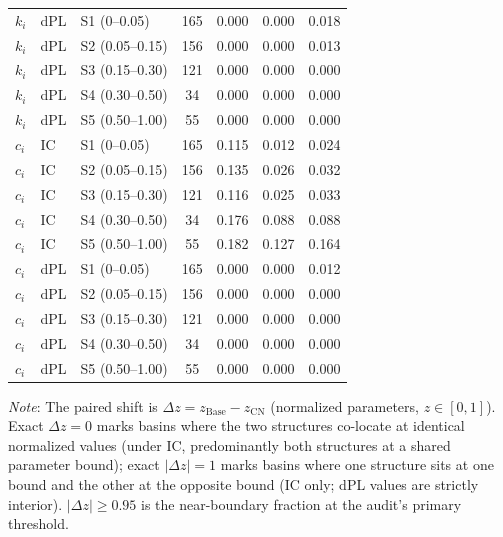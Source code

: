 \begin{table}[t]
\begin{threeparttable}
\begin{tabular}{lllcccc}
$k_i$ & dPL & S1 (0–0.05) & 165 & 0.000 & 0.000 & 0.018 \\
$k_i$ & dPL & S2 (0.05–0.15) & 156 & 0.000 & 0.000 & 0.013 \\
$k_i$ & dPL & S3 (0.15–0.30) & 121 & 0.000 & 0.000 & 0.000 \\
$k_i$ & dPL & S4 (0.30–0.50) & 34 & 0.000 & 0.000 & 0.000 \\
$k_i$ & dPL & S5 (0.50–1.00) & 55 & 0.000 & 0.000 & 0.000 \\
$c_i$ & IC & S1 (0–0.05) & 165 & 0.115 & 0.012 & 0.024 \\
$c_i$ & IC & S2 (0.05–0.15) & 156 & 0.135 & 0.026 & 0.032 \\
$c_i$ & IC & S3 (0.15–0.30) & 121 & 0.116 & 0.025 & 0.033 \\
$c_i$ & IC & S4 (0.30–0.50) & 34 & 0.176 & 0.088 & 0.088 \\
$c_i$ & IC & S5 (0.50–1.00) & 55 & 0.182 & 0.127 & 0.164 \\
$c_i$ & dPL & S1 (0–0.05) & 165 & 0.000 & 0.000 & 0.012 \\
$c_i$ & dPL & S2 (0.05–0.15) & 156 & 0.000 & 0.000 & 0.000 \\
$c_i$ & dPL & S3 (0.15–0.30) & 121 & 0.000 & 0.000 & 0.000 \\
$c_i$ & dPL & S4 (0.30–0.50) & 34 & 0.000 & 0.000 & 0.000 \\
$c_i$ & dPL & S5 (0.50–1.00) & 55 & 0.000 & 0.000 & 0.000 \\
\bottomrule
\end{tabular}
\begin{tablenotes}[flushleft]
\small
\item \textit{Note}: The paired shift is $\Delta z = z_{\mathrm{Base}} - z_{\mathrm{CN}}$ (normalized parameters, $z \in [0,1]$). Exact $\Delta z = 0$ marks basins where the two structures co-locate at identical normalized values (under IC, predominantly both structures at a shared parameter bound); exact $|\Delta z| = 1$ marks basins where one structure sits at one bound and the other at the opposite bound (IC only; dPL values are strictly interior). $|\Delta z| \ge 0.95$ is the near-boundary fraction at the audit's primary threshold.
\end{tablenotes}
\end{threeparttable}
\end{table}
